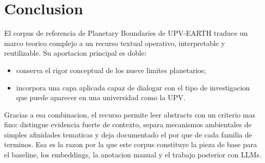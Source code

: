 \documentclass[11pt,a4paper]{article}
\begin{document}
\section{Conclusion}

El corpus de referencia de Planetary Boundaries de UPV-EARTH traduce un marco teorico complejo a un recurso textual operativo, interpretable y reutilizable. Su aportacion principal es doble:

\begin{itemize}
\item conserva el rigor conceptual de los nueve limites planetarios;
\item incorpora una capa aplicada capaz de dialogar con el tipo de investigacion que puede aparecer en una universidad como la UPV.
\end{itemize}

Gracias a esa combinacion, el recurso permite leer abstracts con un criterio mas fino: distingue evidencia fuerte de contexto, separa mecanismos ambientales de simples afinidades tematicas y deja documentado el por que de cada familia de terminos. Esa es la razon por la que este corpus constituye la pieza de base para el baseline, los embeddings, la anotacion manual y el trabajo posterior con LLMs.
\end{document}
